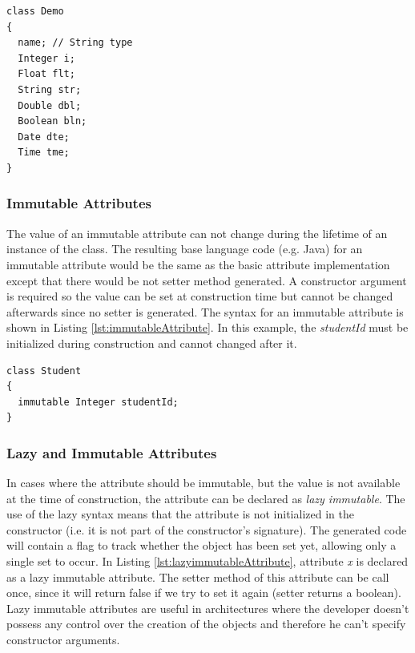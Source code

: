 \begin{lstlisting}[style=umplePlain, label=lst:basicAttribute,caption=Basic Umple attribute]
class Demo 
{
  name; // String type
  Integer i;
  Float flt;
  String str;  
  Double dbl;
  Boolean bln;
  Date dte; 
  Time tme;
}
\end{lstlisting}

\subsubsection{Immutable Attributes}
The value of an immutable attribute can not change during the lifetime of an instance of the class. The resulting base language code (e.g. Java) for an immutable attribute would be the same as the basic attribute implementation except that there would be not setter method generated. A constructor argument is required so the value can be set at construction time but  cannot be changed afterwards since no setter is generated. The syntax for an immutable attribute is shown in Listing \ref{lst:immutableAttribute}. In this example, the \textit{studentId} must be initialized during construction and cannot changed after it. 

\begin{lstlisting}[style=umplePlain,label=lst:immutableAttribute, caption=Immutable Umple attribute]
class Student 
{
  immutable Integer studentId;
}
\end{lstlisting}

\subsubsection{Lazy and Immutable Attributes}
In cases where the attribute should be immutable, but the value is not available at the time of construction, the attribute can be declared as \textit{lazy immutable}. The use of the lazy syntax means that the attribute is not initialized in the constructor (i.e. it is not part of the constructor's signature). The generated code will contain a flag to track whether the object has been set yet, allowing only a single set to occur. In Listing \ref{lst:lazyimmutableAttribute},
attribute \textit{x} is declared as a lazy immutable attribute. The setter method of this attribute can be call once, since it will return false if we try to set it again (setter returns a boolean). Lazy immutable attributes are useful in architectures where the developer doesn't possess any control over the creation of the objects and therefore he can't specify constructor arguments.

